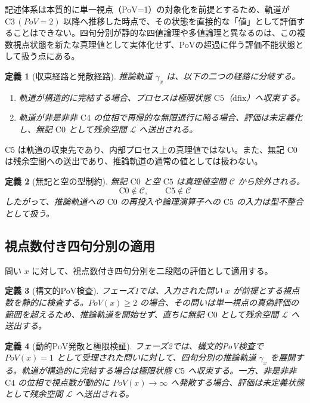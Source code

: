 \documentclass[11pt,a4paper]{article}
\newtheorem{definition}{定義}
\newcommand{\PoV}{\mathit{PoV}}
\newcommand{\C}{\mathcal{C}}
\newcommand{\Lspace}{\mathcal{L}}
\newcommand{\Czero}{\text{C0}}
\newcommand{\dfix}{\text{dfix}}
\newcommand{\Cthree}{\text{C3}}
\newcommand{\Cfour}{\text{C4}}
\newcommand{\Cfive}{\text{C5}}
\begin{document}
記述体系は本質的に単一視点（PoV=1）の対象化を前提とするため、軌道が $\Cthree\, (\PoV=2)$ 以降へ推移した時点で、その状態を直接的な「値」として評価することはできない。四句分別が静的な四値論理や多値論理と異なるのは、この複数視点状態を新たな真理値として実体化せず、PoVの超過に伴う評価不能状態として扱う点にある。

\begin{definition}[収束経路と発散経路]
推論軌道 $\gamma_x$ は、以下の二つの経路に分岐する。
\begin{enumerate}
\item 軌道が構造的に完結する場合、プロセスは極限状態 $\Cfive$（$\dfix$）へ収束する。
\item 軌道が非是非非 $\Cfour$ の位相で再帰的な無限退行に陥る場合、評価は未定義化し、無記 $\Czero$ として残余空間 $\Lspace$ へ送出される。
\end{enumerate}
\end{definition}

$\Cfive$ は軌道の収束先であり、内部プロセス上の真理値ではない。また、無記 $\Czero$ は残余空間への送出であり、推論軌道の通常の値としては扱わない。

\begin{definition}[無記と空の型制約]
無記 $\Czero$ と空 $\Cfive$ は真理値空間 $\C$ から除外される。
\[
\Czero \notin \C, \qquad \Cfive \notin \C
\]
したがって、推論軌道への $\Czero$ の再投入や論理演算子への $\Cfive$ の入力は型不整合として扱う。
\end{definition}

\subsection{視点数付き四句分別の適用}
\label{subsec:pov-fourfold}

問い $x$ に対して、視点数付き四句分別を二段階の評価として適用する。

\begin{definition}[構文的PoV検査]
フェーズ1では、入力された問い $x$ が前提とする視点数を静的に検査する。$\PoV(x) \geq 2$ の場合、その問いは単一視点の真偽評価の範囲を超えるため、推論軌道を開始せず、直ちに無記 $\Czero$ として残余空間 $\Lspace$ へ送出する。
\end{definition}

\begin{definition}[動的PoV発散と極限検証]
フェーズ2では、構文的PoV検査で $\PoV(x)=1$ として受理された問いに対して、四句分別の推論軌道 $\gamma_x$ を展開する。軌道が構造的に完結する場合は極限状態 $\Cfive$ へ収束する。一方、非是非非 $\Cfour$ の位相で視点数が動的に $\PoV(x) \to \infty$ へ発散する場合、評価は未定義状態として残余空間 $\Lspace$ へ送出される。
\end{definition}
\end{document}
